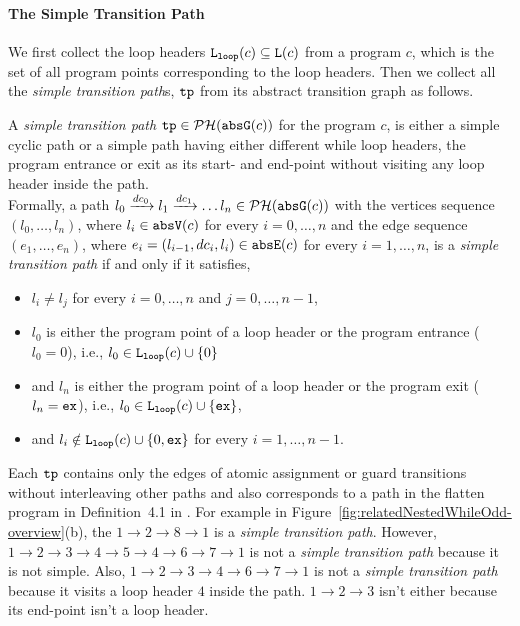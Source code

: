 \paragraph{The Simple Transition Path}
We first collect the loop headers $\mathtt{L}_{\mathtt{loop}}(c) \subseteq \mathtt{L}(c)$ from a program $c$, which is the set of all program points corresponding to the loop headers.
Then we collect all the \emph{simple transition path}s, $\mathtt{tp}$ from its abstract transition graph as follows.
\begin{defn}
  \label{def:tpath}
A \emph{simple transition path}
$\mathtt{tp} \in \mathcal{PH}(\mathtt{abs}{\mathtt{G}}(c))$ for the program $c$, is either a simple cyclic path
or a simple path having either different while loop headers, the program entrance or exit as its start- and end-point
without visiting any loop header inside the path.
\\
Formally, a path $l_0 \xrightarrow{dc_0} l_1 \xrightarrow{dc_1} \ldots l_n \in \mathcal{PH}(\mathtt{abs}{\mathtt{G}}(c))$ with the
vertices sequence $(l_0, \ldots, l_n)$, where $l_i \in \mathtt{abs}{\mathtt{V}}(c)$ for every $i = 0, \ldots, n$ and
%
the edge sequence $(e_1, \ldots, e_n)$, where $e_i = (l_{i - 1}, dc_i, l_{i}) \in \mathtt{abs}{\mathtt{E}}(c)$ for every $i = 1, \ldots, n$,
%
is a \emph{simple transition path} if and only if it satisfies,
\begin{itemize}
  \item $l_i \neq l_j$ for every $i = 0, \ldots, n$ and $j = 0, \ldots, {n - 1}$,
  \item $l_0$ is either the program point of a loop header or the program entrance ($l_0 = 0$),
  i.e., $l_0 \in \mathtt{L}_{\mathtt{loop}}(c) \cup \{ 0 \}$
  \item and $l_n$ is either the program point of a loop header or the program exit ($l_n = \mathtt{ex}$),
  i.e., $l_0 \in \mathtt{L}_{\mathtt{loop}}(c) \cup \{ \mathtt{ex} \}$,
  \item and $l_i \notin \mathtt{L}_{\mathtt{loop}}(c) \cup \{ 0, \mathtt{ex} \}$ for every $i = 1, \ldots, n-1$.
\end{itemize}
\end{defn}
Each $\mathtt{tp}$ 
contains only the edges of atomic assignment or guard transitions without interleaving other paths and also corresponds to a path in the flatten program in Definition~4.1 in \cite{GulwaniJK09}.
For example in Figure~\ref{fig:relatedNestedWhileOdd-overview}(b), the $1 \to 2 \to 8 \to 1$ is a \emph{simple transition path}.
However, $1 \to 2 \to 3 \to 4 \to 5 \to 4 \to 6 \to 7 \to 1$ is not a \emph{simple transition path} because it is not simple.
Also, $1 \to 2 \to 3 \to 4 \to 6 \to 7 \to 1$ is not a \emph{simple transition path} because it visits a loop header $4$ inside the path. $1 \to 2 \to 3$ isn't either because its end-point isn't a loop header.

